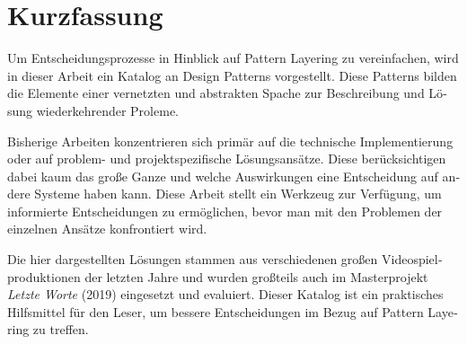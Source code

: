 \chapter{Kurzfassung}

\begin{german}
Um Entscheidungsprozesse in Hinblick auf Pattern Layering zu vereinfachen, wird in dieser Arbeit ein Katalog an Design Patterns vorgestellt. Diese Patterns bilden die Elemente einer vernetzten und abstrakten Spache zur Beschreibung und Lösung wiederkehrender Proleme. 

Bisherige Arbeiten konzentrieren sich primär auf die technische Implementierung oder auf problem- und projektspezifische Lösungsansätze. Diese berücksichtigen dabei kaum das große Ganze und welche Auswirkungen eine Entscheidung auf andere Systeme haben kann. Diese Arbeit stellt ein Werkzeug zur Verfügung, um informierte Entscheidungen zu ermöglichen, bevor man mit den Problemen der einzelnen Ansätze konfrontiert wird. 

Die hier dargestellten Lösungen stammen aus verschiedenen großen Videospielproduktionen der letzten Jahre und wurden großteils auch im Masterprojekt \emph{Letzte Worte} (2019) eingesetzt und evaluiert. Dieser Katalog ist ein praktisches Hilfsmittel für den Leser, um bessere Entscheidungen im Bezug auf Pattern Layering zu treffen. 	
\end{german}